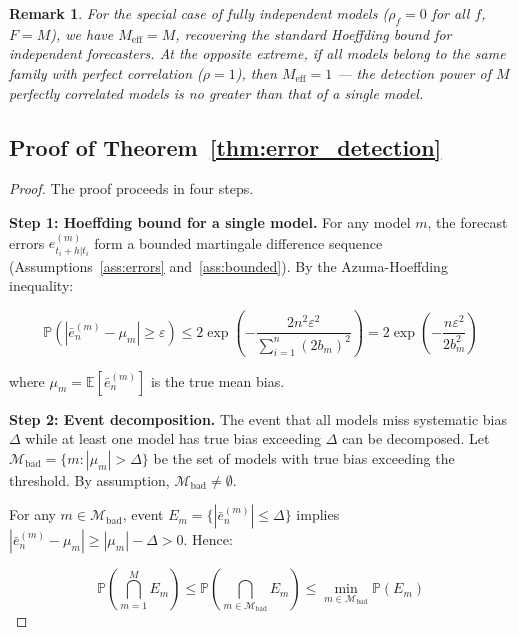 \documentclass[12pt,a4paper]{article}
\newtheorem{remark}[theorem]{Remark}
\begin{document}
\begin{remark}
For the special case of fully independent models ($\rho_f = 0$ for all
$f$, $F = M$), we have $M_{\text{eff}} = M$, recovering the standard
Hoeffding bound for independent forecasters.  At the opposite extreme,
if all models belong to the same family with perfect correlation
($\rho = 1$), then $M_{\text{eff}} = 1$ --- the detection power of $M$
perfectly correlated models is no greater than that of a single model.
\end{remark}

\subsection{Proof of Theorem~\ref{thm:error_detection}}

\begin{proof}
The proof proceeds in four steps.

\medskip\noindent
\textbf{Step 1: Hoeffding bound for a single model.}
For any model $m$, the forecast errors $e_{t_i+h|t_i}^{(m)}$ form a
bounded martingale difference sequence (Assumptions~\ref{ass:errors}
and~\ref{ass:bounded}).  By the Azuma-Hoeffding inequality:

\begin{equation}
    \mathbb{P}\left(|\bar{e}_n^{(m)} - \mu_m| \geq \varepsilon\right)
    \leq 2\exp\left(-\frac{2n^2\varepsilon^2}
    {\sum_{i=1}^n (2b_m)^2}\right)
    = 2\exp\left(-\frac{n\varepsilon^2}{2b_m^2}\right) \label{eq:hoeffding_single}
\end{equation}

where $\mu_m = \mathbb{E}[\bar{e}_n^{(m)}]$ is the true mean bias.

\medskip\noindent
\textbf{Step 2: Event decomposition.}
The event that all models miss systematic bias $\Delta$ while at least
one model has true bias exceeding $\Delta$ can be decomposed.  Let
$\mathcal{M}_{\text{bad}} = \{m : |\mu_m| > \Delta\}$ be the set of
models with true bias exceeding the threshold.  By assumption,
$\mathcal{M}_{\text{bad}} \neq \emptyset$.

For any $m \in \mathcal{M}_{\text{bad}}$, event $E_m = \{|\bar{e}_n^{(m)}|
\leq \Delta\}$ implies $|\bar{e}_n^{(m)} - \mu_m| \geq |\mu_m| - \Delta >
0$.  Hence:

\begin{equation}
    \mathbb{P}\left(\bigcap_{m=1}^{M} E_m\right) \leq
    \mathbb{P}\left(\bigcap_{m \in \mathcal{M}_{\text{bad}}} E_m\right)
    \leq \min_{m \in \mathcal{M}_{\text{bad}}} \mathbb{P}(E_m)
    \label{eq:event_decomp}
\end{equation}


\end{proof}
\end{document}
